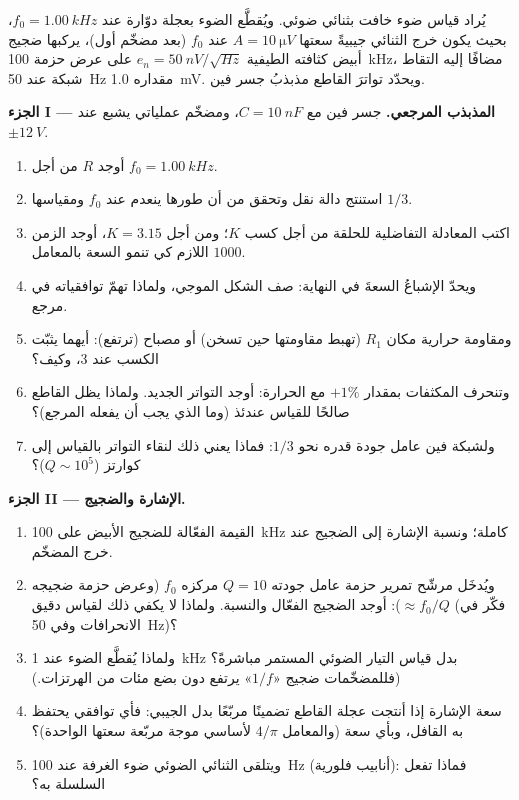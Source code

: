\begin{problem}
\label{pb:b2:feedback-oscillators:1}

يُراد قياس ضوء خافت بثنائي ضوئي. ويُقطَّع الضوء
بعجلة دوّارة عند $f_0 = \qty{1.00}{kHz}$، بحيث يكون خرج الثنائي
جيبيةً سعتها $A = \qty{10}{\micro V}$ عند $f_0$ (بعد
مضخّم أول)، يركبها ضجيج أبيض كثافته الطيفية
$e_n = \qty{50}{nV/\sqrt{Hz}}$ على عرض حزمة \qty{100}{kHz}، مضافًا إليه
التقاط شبكة عند \qty{50}{Hz} مقداره \qty{1.0}{mV}. ويحدّد تواترَ القاطع
مذبذبُ جسر فين.

\medskip
\noindent\textbf{الجزء I --- المذبذب المرجعي.}
جسر فين مع $C = \qty{10}{nF}$، ومضخّم عملياتي يشبع عند $\pm\qty{12}{V}$.
\begin{enumerate}
  \item أوجد $R$ من أجل $f_0 = \qty{1.00}{kHz}$.
  \item استنتج دالة نقل  وتحقق من
        أن طورها ينعدم عند $f_0$ ومقياسها $1/3$.
  \item اكتب المعادلة التفاضلية للحلقة من أجل كسب $K$؛ ومن أجل
        $K = 3.15$، أوجد الزمن اللازم كي تنمو السعة بالمعامل $1000$.
  \item ويحدّ الإشباعُ السعةَ في النهاية: صف الشكل الموجي،
        ولماذا تهمّ توافقياته في مرجع.
  \item ومقاومة حرارية مكان $R_1$ (تهبط مقاومتها حين
        تسخن) أو مصباح (ترتفع): أيهما يثبّت الكسب عند 3،
        وكيف؟
  \item وتنحرف المكثفات بمقدار $+1\%$ مع الحرارة: أوجد التواتر الجديد.
        ولماذا يظل القاطع صالحًا للقياس عندئذ (وما الذي
        يجب أن يفعله المرجع)؟
  \item ولشبكة فين عامل جودة قدره نحو $1/3$: فماذا يعني
        ذلك لنقاء التواتر بالقياس إلى كوارتز
        ($Q \sim 10^5$)؟
\end{enumerate}

\medskip
\noindent\textbf{الجزء II --- الإشارة والضجيج.}
\begin{enumerate}[resume]
  \item القيمة الفعّالة للضجيج الأبيض على \qty{100}{kHz} كاملة؛
        ونسبة الإشارة إلى الضجيج عند خرج المضخّم.
  \item ويُدخَل مرشّح تمرير حزمة عامل جودته $Q = 10$ مركزه $f_0$
        (وعرض حزمة ضجيجه $\approx f_0/Q$): أوجد الضجيج الفعّال والنسبة.
        ولماذا لا يكفي ذلك لقياس دقيق (فكّر في
        الانحرافات وفي \qty{50}{Hz})؟
  \item ولماذا يُقطَّع الضوء عند \qty{1}{kHz} بدل قياس التيار
        الضوئي المستمر مباشرةً؟ (فللمضخّمات ضجيج «$1/f$» يرتفع
        دون بضع مئات من الهرتزات.)
  \item سعة الإشارة إذا أنتجت عجلة القاطع تضمينًا
        مربّعًا بدل الجيبي: فأي توافقي يحتفظ به القافل،
        وبأي سعة (والمعامل $4/\pi$ لأساسي موجة مربّعة سعتها الواحدة)؟
  \item ويتلقى الثنائي الضوئي ضوء الغرفة عند \qty{100}{Hz}
        (أنابيب فلورية): فماذا تفعل السلسلة به؟
\end{enumerate}


\end{problem}

